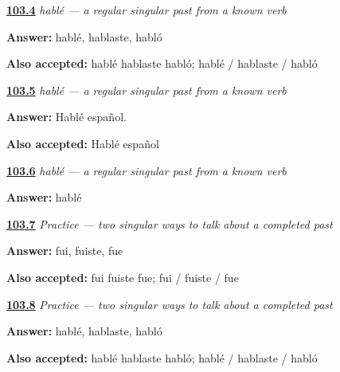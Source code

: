 \noindent\begin{minipage}[t]{\linewidth}
\raggedright
\hyperlink{review-ES-C14-hablar-preterite-singular-forms}{\textbf{103.4}} \emph{hablé — a regular singular past from a known verb}\par
\small \textbf{Answer:} hablé, hablaste, habló\par
\footnotesize \textbf{Also accepted:} hablé hablaste habló; hablé / hablaste / habló
\end{minipage}\par\medskip

\noindent\begin{minipage}[t]{\linewidth}
\raggedright
\hyperlink{review-ES-C14-hablar-preterite-hable-espanol}{\textbf{103.5}} \emph{hablé — a regular singular past from a known verb}\par
\small \textbf{Answer:} Hablé español.\par
\footnotesize \textbf{Also accepted:} Hablé español
\end{minipage}\par\medskip

\noindent\begin{minipage}[t]{\linewidth}
\raggedright
\hyperlink{review-ES-C14-hablar-preterite-present-past}{\textbf{103.6}} \emph{hablé — a regular singular past from a known verb}\par
\small \textbf{Answer:} hablé\par
\end{minipage}\par\medskip

\noindent\begin{minipage}[t]{\linewidth}
\raggedright
\hyperlink{review-ES-C14-practice-ser-ir-forms}{\textbf{103.7}} \emph{Practice — two singular ways to talk about a completed past}\par
\small \textbf{Answer:} fui, fuiste, fue\par
\footnotesize \textbf{Also accepted:} fui fuiste fue; fui / fuiste / fue
\end{minipage}\par\medskip

\noindent\begin{minipage}[t]{\linewidth}
\raggedright
\hyperlink{review-ES-C14-practice-ar-forms}{\textbf{103.8}} \emph{Practice — two singular ways to talk about a completed past}\par
\small \textbf{Answer:} hablé, hablaste, habló\par
\footnotesize \textbf{Also accepted:} hablé hablaste habló; hablé / hablaste / habló
\end{minipage}\par\medskip

